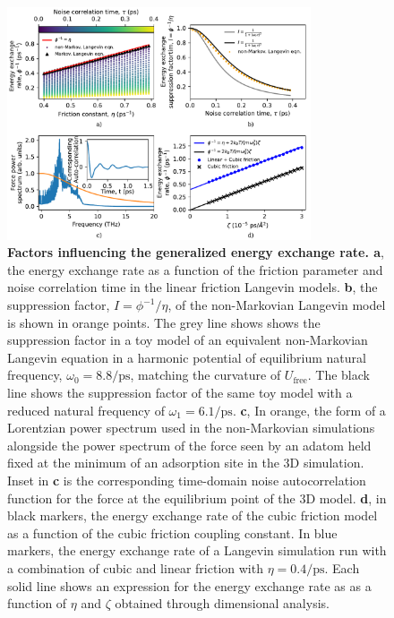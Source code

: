 \documentclass[7pt]{article}
\newcommand{\ips}{\si{\per\pico\second}}
\begin{document}
\begin{figure}
	\centering
	\includegraphics[width=0.8\textwidth]{energy_exchange_rates}
	\caption{\textbf{Factors influencing the generalized energy exchange rate. a}, the energy exchange rate as a function of the friction parameter and noise correlation time in the linear friction Langevin models. \textbf{b}, the suppression factor, $I=\phi^{-1}/\eta$, of the non-Markovian Langevin model is shown in orange points. The grey line shows shows the suppression factor in a toy model of an equivalent non-Markovian Langevin equation in a harmonic potential of equilibrium natural frequency, $\omega_0=8.8\ips$, matching the curvature of $U_{\text{free}}$. The black line shows the suppression factor of the same toy model with a reduced natural frequency of $\omega_1=6.1\ips$. \textbf{c}, In orange, the form of a Lorentzian power spectrum used in the non-Markovian simulations alongside the power spectrum of the force seen by an adatom held fixed at the minimum of an adsorption site in the 3D simulation. Inset in \textbf{c} is the corresponding time-domain noise autocorrelation function for the force at the equilibrium point of the 3D model. \textbf{d}, in black markers, the energy exchange rate of the cubic friction model as a function of the cubic friction coupling constant. In blue markers, the energy exchange rate of a Langevin simulation run with a combination of cubic and linear friction with $\eta=0.4\ips$. Each solid line shows an expression for the energy exchange rate as as a function of $\eta$ and $\zeta$ obtained through dimensional analysis.} 
	\label{fig:energy_exchange_rates}
\end{figure}
\end{document}
